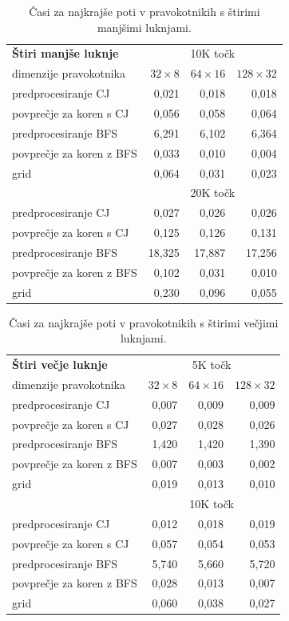 \documentclass[a4paper, 12pt]{book}
\begin{document}
\begin{table}[htp]
\begin{center}
\begin{tabular}{l*{3}{r}}
\textbf{Štiri manjše luknje} & \multicolumn{3}{c}{10K točk} \\
dimenzije pravokotnika	&	$32\times 8$	&	$64\times 16$	&	$128\times 32$	\\						
\hline
predprocesiranje CJ &	0,021	&	0,018	&	0,018	\\
povprečje za koren s CJ	&	0,056	&	0,058	&	0,064	\\
predprocesiranje BFS	&	6,291	&	6,102	&	6,364	\\
povprečje za koren z BFS	&	0,033	&	0,010	&	0,004	\\
grid				&	0,064	&	0,031	&	0,023	\\
\hline
& \multicolumn{3}{c}{20K točk} \\
\hline
predprocesiranje CJ &  0,027	&	0,026	&	0,026 \\
povprečje za koren s CJ &	0,125	&	0,126	&	0,131 \\
predprocesiranje BFS &	18,325	&	17,887	&	17,256	\\
povprečje za koren z BFS & 0,102	&	0,031	&	0,010 \\
grid &	0,230	&	0,096	&	0,055 
\end{tabular}
\caption{Časi za najkrajše poti v pravokotnikih s štirimi manjšimi luknjami.}
\label{table4}
\end{center}
\end{table}

\begin{table}[htp]
\begin{center}
\begin{tabular}{l*{3}{r}}
\textbf{Štiri večje luknje} & \multicolumn{3}{c}{5K točk} \\
dimenzije pravokotnika	&	$32\times 8$	&	$64\times 16$	&	$128\times 32$ \\						
\hline
predprocesiranje CJ	&	0,007	&	0,009	&	0,009	\\
povprečje za koren s CJ	&	0,027	&	0,028	&	0,026	\\
predprocesiranje BFS	&	1,420	&	1,420	&	1,390	\\
povprečje za koren z BFS	&	0,007	&	0,003	&	0,002	\\
grid				&	0,019	&	0,013	&	0,010	\\
\hline
& \multicolumn{3}{c}{10K točk} \\
\hline
predprocesiranje CJ &	0,012	&	0,018	&	0,019	\\
povprečje za koren s CJ &	0,057	&	0,054	&	0,053	\\
predprocesiranje BFS &	5,740	&	5,660	&	5,720	\\
povprečje za koren z BFS &	0,028	&	0,013	&	0,007	\\
grid &	0,060	&	0,038	&	0,027 
\end{tabular}
\caption{Časi za najkrajše poti v pravokotnikih s štirimi večjimi luknjami.}
\label{table5}
\end{center}
\end{table}
\end{document}
